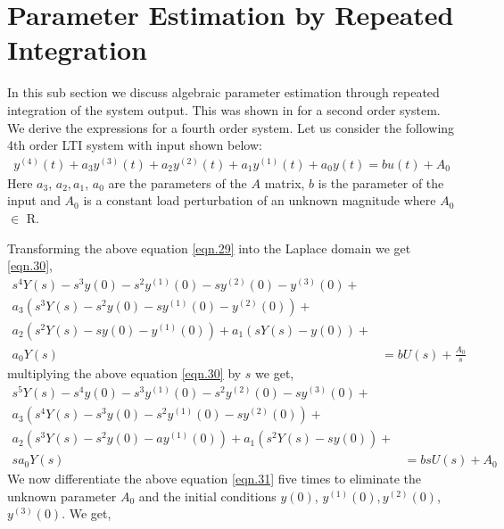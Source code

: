 \documentclass[letterpaper%
, twoside%
, 12pt%
,memoire%
, english%
,creativecommons,hyperref%
]{thETS}
\theoremstyle{newThmStyle}
\begin{document}
\section{Parameter Estimation by Repeated Integration \citep{fliess2003algebraic}} \label{Sec:App3}
In this sub section we discuss algebraic parameter estimation through repeated integration of the system output. This was shown in \citep{fliess2003algebraic} for a second order system. We derive the expressions for a fourth order system. Let us consider the following 4th order LTI system with input shown below:
\begin{equation}\label{eqn.29}
\begin{split}
y^{(4)}(t)+a_{3}y^{(3)}(t)+a_{2}y^{(2)}(t)+a_{1}y^{(1)}(t)+a_{0}y(t) = b u(t) +A_{0}
\end{split}
\end{equation}
Here $a_{3}$, $a_{2}, a_{1}$, $a_{0}$ are the parameters of the $A$ matrix, $b$ is the parameter of the input and $A_{0}$ is a constant load perturbation of an unknown magnitude where $A_{0}$ $\in$ $\mathrm{R}$.
\par Transforming the above equation \eqref{eqn.29} into the Laplace domain we get \eqref{eqn.30},
\begin{equation}\label{eqn.30}
\begin{split}
s^4Y(s) - s^3y(0) - s^2y^{(1)}(0) - sy^{(2)}(0) - y^{(3)}(0) + & \\
a_{3}(s^3Y(s) - s^2y(0) - sy^{(1)}(0) - y^{(2)}(0)) + & \\
a_{2}(s^2Y(s) - sy(0) - y^{(1)}(0)) + a_{1}(sY(s)-y(0)) + & \\
a_{0}Y(s) &= b U(s) + \frac{A_{0}}{s}
\end{split}
\end{equation}
multiplying the above equation \eqref{eqn.30} by $s$ we get,
\begin{equation}\label{eqn.31}
\begin{split}
s^5Y(s) - s^4y(0) - s^3y^{(1)}(0) - s^2y^{(2)}(0) - sy^{(3)}(0) + & \\
a_{3}(s^4Y(s) - s^3y(0) - s^2y^{(1)}(0) - sy^{(2)}(0)) + & \\
a_{2}(s^3Y(s) - s^2y(0) - ay^{(1)}(0)) + a_{1}(s^2Y(s)-sy(0)) + &\\
sa_{0}Y(s) &= bs U(s) + A_{0}
\end{split}
\end{equation}
We now differentiate the above equation \eqref{eqn.31} five times to eliminate the unknown parameter $A_{0}$ and the initial conditions $y(0)$, $y^{(1)}(0), y^{(2)}(0)$, $y^{(3)}(0)$. We get,
\end{document}

